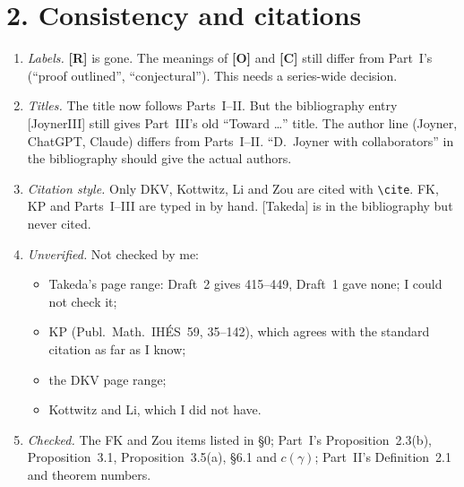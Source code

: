 \documentclass[11pt]{article}
\begin{document}
\section*{2. Consistency and citations}
\begin{enumerate}[label=(\arabic*)]
\item \emph{Labels.} \textbf{[R]} is gone. The meanings of
\textbf{[O]} and \textbf{[C]} still differ from Part~I's (``proof
outlined'', ``conjectural''). This needs a series-wide decision.
\item \emph{Titles.} The title now follows Parts~I--II. But the
bibliography entry [JoynerIII] still gives Part~III's old ``Toward
\ldots'' title. The author line (Joyner, ChatGPT, Claude) differs from
Parts~I--II. ``D.~Joyner with collaborators'' in the bibliography should
give the actual authors.
\item \emph{Citation style.} Only DKV, Kottwitz, Li and Zou are cited with
\verb|\cite|. FK, KP and Parts~I--III are typed in by hand. [Takeda] is
in the bibliography but never cited.
\item \emph{Unverified.} Not checked by me:
\begin{itemize}
\item Takeda's page range: Draft~2 gives 415--449, Draft~1 gave none;
I could not check it;
\item KP (Publ.\ Math.\ IH\'ES~59, 35--142), which agrees with the
standard citation as far as I know;
\item the DKV page range;
\item Kottwitz and Li, which I did not have.
\end{itemize}
\item \emph{Checked.} The FK and Zou items listed in \S0; Part~I's
Proposition~2.3(b), Proposition~3.1, Proposition~3.5(a), \S6.1 and
$c(\gamma)$; Part~II's Definition~2.1 and theorem numbers.
\end{enumerate}
\end{document}
